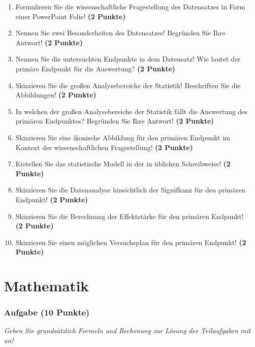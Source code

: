 \documentclass[a4paper, 9pt]{scrartcl}\usepackage[]{graphicx}\usepackage[]{xcolor}
\begin{document}
\begin{enumerate}
  \setcounter{enumi}{0}
  \item Formulieren Sie die wissenschaftliche Fragestellung des Datensatzes in Form einer PowerPoint Folie! \textbf{(2 Punkte)}
  \item Nennen Sie zwei Besonderheiten des Datensatzes! Begründen Sie Ihre Antwort! \textbf{(2 Punkte)}
  \item Nennen Sie die untersuchten Endpunkte in dem Datensatz! Wie lautet der primäre Endpunkt für die Auswertung? \textbf{(2 Punkte)}
  \item Skizzieren Sie die großen Analysebereiche der Statistik! Beschriften Sie die Abbildungen! \textbf{(2 Punkte)}
  \item In welchen der großen Analysebereiche der Statistik fällt die Auswertung des primären Endpunktes? Begründen Sie Ihre Antwort! \textbf{(2 Punkte)}
  \item Skizzieren Sie eine ikonische Abbildung für den primären Endpunkt im Kontext der wissenschaftlichen Fragestellung! \textbf{(2 Punkte)}
  \item Erstellen Sie das statistische Modell in der in \Rlogo üblichen Schreibweise! \textbf{(2 Punkte)}
  \item Skizzieren Sie die Datenanalyse hinsichtlich der Signifkanz für den primären Endpunkt! \textbf{(2 Punkte)}
  \item Skizzieren Sie die Berechnung der Effektstärke für den primären Endpunkt! \textbf{(2 Punkte)}
  \item Skizzieren Sie einen möglichen Versuchsplan für den primären Endpunkt! \textbf{(2 Punkte)}
\end{enumerate}
 
\clearpage
\part{Mathematik}

\section{Aufgabe \hfill (10 Punkte)}

\textit{Geben Sie grundsätzlich Formeln und Rechenweg zur Lösung der Teilaufgaben mit an!} \\[1Ex]
 
\end{document}

